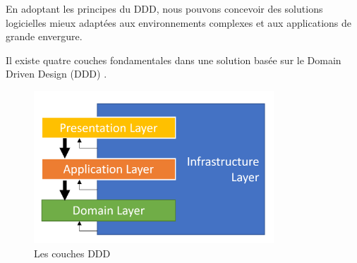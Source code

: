 En adoptant les principes du DDD, nous pouvons concevoir des solutions logicielles mieux adaptées aux environnements complexes et aux applications de grande envergure.

Il existe quatre couches fondamentales dans une solution basée sur le Domain Driven Design (DDD) \cite{ref9}.

\begin{figure}[H]
    \centering
    \includegraphics[width=9cm]{Figures/dddl.png}
    \caption{Les couches DDD}
\end{figure}


